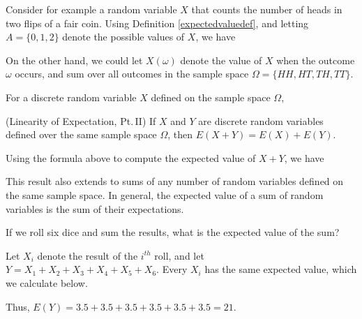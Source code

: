 \par
Consider for example a random variable $X$ that counts the number of heads in two flips of a fair coin. Using Definition \ref{expectedvaluedef}, and letting $A = \{0,1,2\}$ denote the possible values of $X$, we have
\par
On the other hand, we could let $X(\omega)$ denote the value of $X$ when the outcome $\omega$ occurs, and sum over all outcomes in the sample space $\Omega = \{HH, HT, TH, TT\}$.
\par
\begin{prop} For a discrete random variable $X$ defined on the sample space $\Omega$, 
\end{prop}
\begin{thm}\label{LinearityII}
(Linearity of Expectation, Pt.\,II) If $X$  and $Y$ are discrete random variables defined over the same sample space $\Omega$, then $E(X+Y) = E(X) + E(Y)$.
\end{thm}
\begin{pf} Using the formula above to compute the expected value of $X+Y$, we have
\end{pf}

This result also extends to sums of any number of random variables defined on the same sample space. In general, the expected value of a sum of random variables is the sum of their expectations.

\begin{examp}
If we roll six dice and sum the results, what is the expected value of the sum? 
\par
\noindent Let $X_i$ denote the result of the $i^{th}$ roll, and let $Y = X_1 + X_2 + X_3 + X_4+ X_5 + X_6$. Every $X_i$ has the same expected value, which we calculate below.
\vspace{0.5em}
\par
\noindent Thus, $E(Y) = 3.5 + 3.5 + 3.5 + 3.5 + 3.5 + 3.5 = 21$.
\end{examp}


